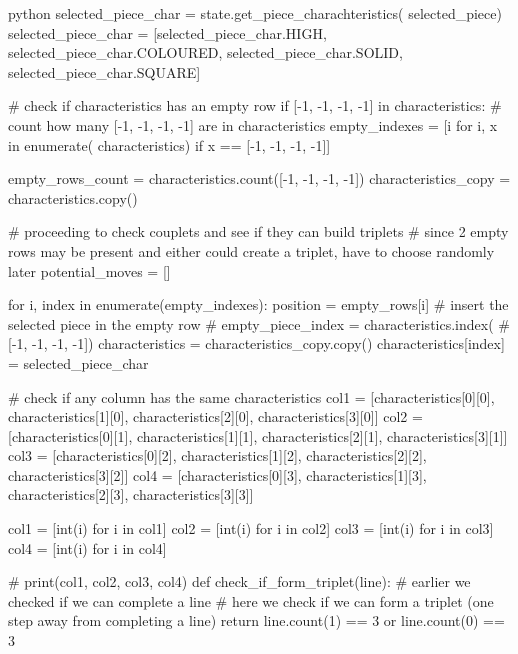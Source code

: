 \begin{mintedbox}{python}
            selected_piece_char = state.get_piece_charachteristics(
                selected_piece)
            selected_piece_char = [selected_piece_char.HIGH, selected_piece_char.COLOURED,
                                    selected_piece_char.SOLID, selected_piece_char.SQUARE]

            # check if characteristics has an empty row
            if [-1, -1, -1, -1] in characteristics:
                # count how many [-1, -1, -1, -1] are in characteristics
                empty_indexes = [i for i, x in enumerate(
                    characteristics) if x == [-1, -1, -1, -1]]

                empty_rows_count = characteristics.count([-1, -1, -1, -1])
                characteristics_copy = characteristics.copy()

                # proceeding to check couplets and see if they can build triplets
                # since 2 empty rows may be present and either could create a triplet, have to choose randomly later
                potential_moves = []

                for i, index in enumerate(empty_indexes):
                    position = empty_rows[i]
                    # insert the selected piece in the empty row
                    # empty_piece_index = characteristics.index(
                    #     [-1, -1, -1, -1])
                    characteristics = characteristics_copy.copy()
                    characteristics[index] = selected_piece_char

                    # check if any column has the same characteristics
                    col1 = [characteristics[0][0], characteristics[1][0],
                            characteristics[2][0], characteristics[3][0]]
                    col2 = [characteristics[0][1], characteristics[1][1],
                            characteristics[2][1], characteristics[3][1]]
                    col3 = [characteristics[0][2], characteristics[1][2],
                            characteristics[2][2], characteristics[3][2]]
                    col4 = [characteristics[0][3], characteristics[1][3],
                            characteristics[2][3], characteristics[3][3]]

                    col1 = [int(i) for i in col1]
                    col2 = [int(i) for i in col2]
                    col3 = [int(i) for i in col3]
                    col4 = [int(i) for i in col4]

                    # print(col1, col2, col3, col4)
                    def check_if_form_triplet(line):
                        # earlier we checked if we can complete a line
                        # here we check if we can form a triplet (one step away from completing a line)
                        return line.count(1) == 3 or line.count(0) == 3


\end{mintedbox}
